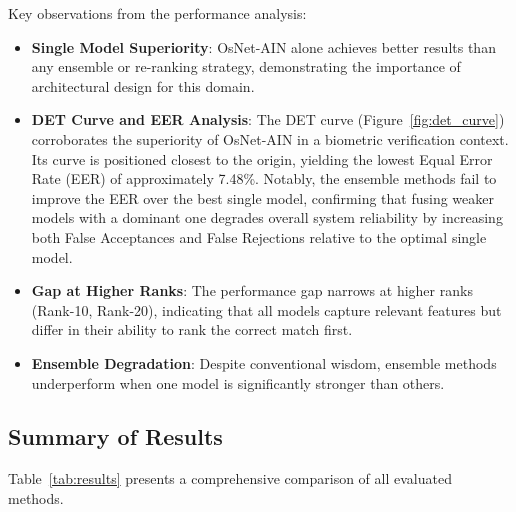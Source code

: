 \documentclass[10pt,twocolumn,letterpaper]{article}
\begin{document}
Key observations from the performance analysis:
\begin{itemize}
    \item \textbf{Single Model Superiority}: OsNet-AIN alone achieves better results than any ensemble or re-ranking strategy, demonstrating the importance of architectural design for this domain.
    \item \textbf{DET Curve and EER Analysis}: The DET curve (Figure~\ref{fig:det_curve}) corroborates the superiority of OsNet-AIN in a biometric verification context. Its curve is positioned closest to the origin, yielding the lowest Equal Error Rate (EER) of approximately 7.48\%. Notably, the ensemble methods fail to improve the EER over the best single model, confirming that fusing weaker models with a dominant one degrades overall system reliability by increasing both False Acceptances and False Rejections relative to the optimal single model.
    \item \textbf{Gap at Higher Ranks}: The performance gap narrows at higher ranks (Rank-10, Rank-20), indicating that all models capture relevant features but differ in their ability to rank the correct match first.
    \item \textbf{Ensemble Degradation}: Despite conventional wisdom, ensemble methods underperform when one model is significantly stronger than others.
\end{itemize}

\subsection{Summary of Results}

Table~\ref{tab:results} presents a comprehensive comparison of all evaluated methods.
\end{document}
